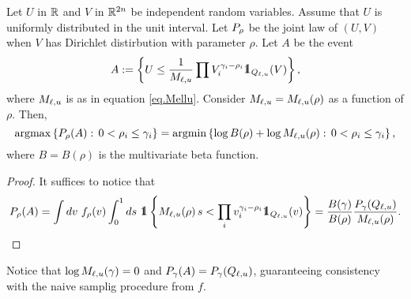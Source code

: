 \documentclass[10pt, article,table]{article}
\begin{document}
\begin{prop}\label{prop.proposal_param}
 Let $U$ in $\R$ and $V$ in $\R^{2n}$ be independent random variables. Assume that $U$ is uniformly distributed in the unit interval.  Let $\dirichletLaw[\rho]$ be the joint law of $(U,V)$ when $V$ has Dirichlet distirbution with parameter $\rho$. Let $A$ be the event
 \begin{equation*}
  A:=\left\lbrace
  U
  \leq
  \frac{1}{M\subscriptellu}
  \prod V_{i}^{\dirparam_i - \rho_i}\one_{Q\subscriptellu}(V)
  \right\rbrace,
 \end{equation*}
 where $M\subscriptellu$ is as in equation \eqref{eq.Mellu}. Consider $M\subscriptellu = M\subscriptellu(\rho)$ as a function of $\rho$.  Then,
 \begin{equation*}
  \argmax\left\lbrace
  \dirichletLaw[\rho](A): \, 0<\rho_i\leq \dirparam_i
  \right\rbrace
  =
  \argmin\left\lbrace
  \log B(\rho)
  + \log M\subscriptellu (\rho)
  : \, 0<\rho_i\leq \dirparam_i
  \right\rbrace,
 \end{equation*}
 where $B=B(\rho)$ is the multivariate beta function. 
\end{prop}
\begin{proof}
It suffices to notice that
 \begin{equation*}
  \dirichletLaw[\rho](A)
  =
     \int dv \, \, \dirichletDensity[\rho](v)
   \int_{0}^{1}ds\, \, 
   \one\left\lbrace
   M\subscriptellu(\rho) \,  s < \prod_i v_{i}^{\dirparam_i - \rho_i} \one_{Q_{\ell,u}}(v)
   \right\rbrace
  =
  \frac{B(\dirparam)}{B(\rho)}
  \frac{\dirichletLaw(Q\subscriptellu)}{M\subscriptellu(\rho)}.
 \end{equation*}
\end{proof}
\begin{remark}
 Notice that $\log M\subscriptellu (\dirparam)=0$ and $\dirichletLaw(A)=\dirichletLaw(Q\subscriptellu)$, guaranteeing consistency with the naive samplig procedure from $f$. 
\end{remark}
\end{document}
